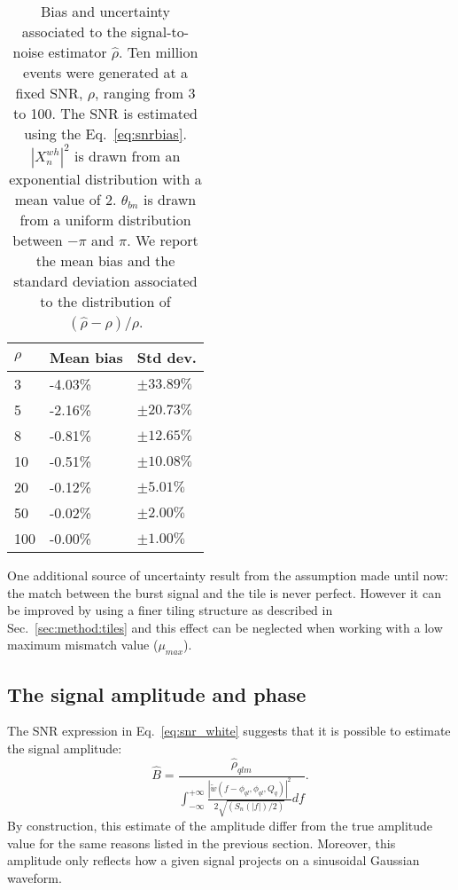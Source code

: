 \begin{table}
  \begin{center}
    \begin{tabular}{ m{2cm} m{2cm} m{2cm} } 
      $\rho$ & Mean bias    & Std dev.      \\ \hline
      3      & -4.03\% & $\pm 33.89\%$ \\
      5      & -2.16\% & $\pm 20.73\%$ \\
      8      & -0.81\% & $\pm 12.65\%$ \\
      10     & -0.51\% & $\pm 10.08\%$ \\
      20     & -0.12\% & $\pm 5.01\%$  \\
      50     & -0.02\% & $\pm 2.00\%$  \\
      100    & -0.00\% & $\pm 1.00\%$  \\ \hline
    \end{tabular}
  \end{center}
  \label{tab:snrestimator}
  \caption{Bias and uncertainty associated to the signal-to-noise estimator $\hat{\rho}$. Ten million events were generated at a fixed SNR, $\rho$, ranging from 3 to 100. The SNR is estimated using the Eq.~\ref{eq:snrbias}. $|X^{wh}_n|^2$ is drawn from an exponential distribution with a mean value of 2. $\theta_{bn}$ is drawn from a uniform distribution between $-\pi$ and $\pi$. We report the mean bias and the standard deviation associated to the distribution of $(\hat{\rho} - \rho)/\rho$.}
  \end{table}

One additional source of uncertainty result from the assumption made until now: the match between the burst signal and the tile is never perfect. However it can be improved by using a finer tiling structure as described in Sec.~\ref{sec:method:tiles} and this effect can be neglected when working with a low maximum mismatch value ($\mu_{max}$).


\subsection{The signal amplitude and phase} \label{sec:method:ampphase}

The SNR expression in Eq.~\ref{eq:snr_white} suggests that it is possible to estimate the signal amplitude:
\begin{equation}
  \hat{B} = \frac{\hat{\rho}_{qlm}}{\int_{-\infty}^{+\infty}{\frac{|\tilde{w}(f-\phi_{ql},\phi_{ql},Q_q)|^2}{2\sqrt{(S_n(|f|)/2)}}df}}.
  \label{eq:amplitude}
\end{equation}
By construction, this estimate of the amplitude differ from the true amplitude value for the same reasons listed in the previous section. Moreover, this amplitude only reflects how a given signal projects on a sinusoidal Gaussian waveform.

